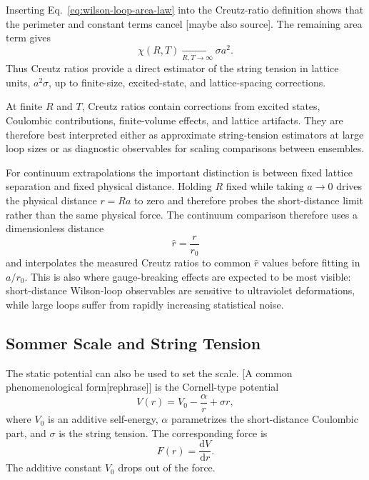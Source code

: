 \documentclass[12pt,a4paper,oneside,numbers=noenddot]{scrreprt}
\newcommand{\dd}{\mathrm{d}}
\newcommand{\latspacing}{a}
\newcommand{\rzero}{r_0}
\newcommand{\stringtension}{\sigma}
\begin{document}
Inserting Eq.~\eqref{eq:wilson-loop-area-law} into the Creutz-ratio definition
shows that the perimeter and constant terms cancel [maybe also source]. The remaining area term
gives
\begin{equation}
  \chi(R,T)
  \xrightarrow[R,T\to\infty]{}
  \stringtension \latspacing^2 .
  \label{eq:creutz-ratio-string-tension-limit}
\end{equation}
Thus Creutz ratios provide a direct estimator of the string tension in lattice
units, \( \latspacing^2\stringtension \), up to finite-size, excited-state, and
lattice-spacing corrections.

At finite $R$ and $T$, Creutz ratios contain corrections from excited states,
Coulombic contributions, finite-volume effects, and lattice artifacts. They are
therefore best interpreted either as approximate string-tension estimators at
large loop sizes or as diagnostic observables for scaling comparisons between
ensembles.

For continuum extrapolations the important distinction is between fixed lattice
separation and fixed physical distance. Holding $R$ fixed while taking
$\latspacing\to0$ drives the physical distance $r=R\latspacing$ to zero and
therefore probes the short-distance limit rather than the same physical force.
The continuum comparison therefore uses a dimensionless distance
\begin{equation}
  \hat r = \frac{r}{\rzero}
\end{equation}
and interpolates the measured Creutz ratios to common $\hat r$ values before
fitting in $\latspacing/\rzero$. This is also where gauge-breaking effects are
expected to be most visible: short-distance Wilson-loop observables are
sensitive to ultraviolet deformations, while large loops suffer from rapidly
increasing statistical noise.

\subsection{Sommer Scale and String Tension}
\label{subsec:sommer-scale-string-tension}

The static potential can also be used to set the scale. [A common
phenomenological form[rephrase]] is the Cornell-type potential
\begin{equation}
  V(r)
  =
  V_0
  -
  \frac{\alpha}{r}
  +
  \stringtension r,
  \label{eq:cornell-potential}
\end{equation}
where $V_0$ is an additive self-energy, $\alpha$ parametrizes the short-distance
Coulombic part, and $\stringtension$ is the string tension. The corresponding
force is
\begin{equation}
  F(r)
  =
  \frac{\dd V}{\dd r}.
\end{equation}
The additive constant $V_0$ drops out of the force.
\end{document}
